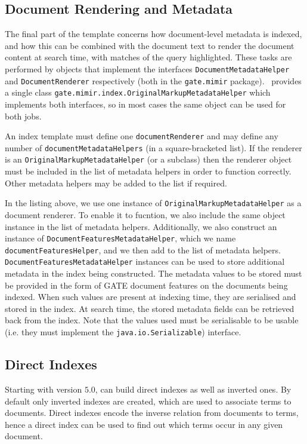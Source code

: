 \subsection*{Document Rendering and Metadata}

The final part of the template concerns how document-level metadata is indexed,
and how this can be combined with the document text to render the document
content at search time, with matches of the query highlighted.  These tasks are
performed by objects that implement the interfaces
\lstinline!DocumentMetadataHelper! and \lstinline!DocumentRenderer!
respectively (both in the \lstinline!gate.mimir! package). \Mimir\ provides a
single class \lstinline!gate.mimir.index.OriginalMarkupMetadataHelper!
which implements both interfaces, so in most cases the same object can be used
for both jobs.

An index template must define one \lstinline!documentRenderer! and may define
any number of \lstinline!documentMetadataHelpers! (in a square-bracketed list).
If the renderer is an \lstinline!OriginalMarkupMetadataHelper! (or a subclass)
then the renderer object must be included in the list of metadata helpers in
order to function correctly.  Other metadata helpers may be added to the list
if required.

In the listing above, we use one instance of
\lstinline!OriginalMarkupMetadataHelper! as a document renderer. To enable it to
fucntion, we also include the same object instance in the list of metadata
helpers. Additionally, we also construct an instance of
\lstinline!DocumentFeaturesMetadataHelper!, which we name
\lstinline!documentFeaturesHelper!, and we then add to the list of metadata
helpers. \lstinline!DocumentFeaturesMetadataHelper! instances can be used to
store additional metadata in the index being constructed. The metadata values to
be stored must be provided in the form of GATE document features on the
documents being indexed. When such values are present at indexing time, they are
serialised and stored in the index. At search time, the stored metadata fields
can be retrieved back from the index. Note that the values used must be
serialisable to be usable (i.e. they must implement the 
\lstinline!java.io.Serializable!) interface. 

\subsection*{Direct Indexes}
\label{sec:direct-indexes}
Starting with version $5.0$, \Mimir{} can build direct indexes as well as
inverted ones. By default only inverted indexes are created, which are used to associate
terms to documents. Direct indexes encode the inverse relation from documents to
terms, hence a direct index can be used to find out which terms occur in any
given document.

